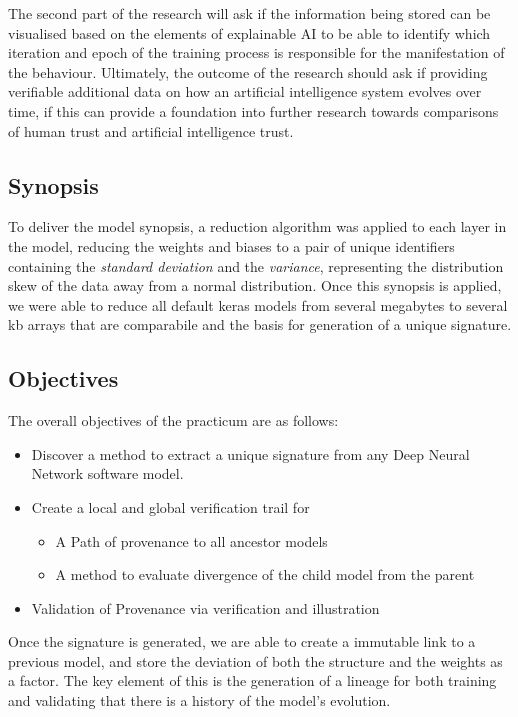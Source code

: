  The second part of the research will ask if the
information being stored can be visualised based on the elements of explainable
AI to be able to identify which iteration and epoch of the training process is
responsible for the manifestation of the behaviour. Ultimately, the outcome of
the research should ask if providing verifiable additional data on how an
artificial intelligence system evolves over time, if this can provide a
foundation into further research towards comparisons of human trust and
artificial intelligence trust.

\subsection{Synopsis}
To deliver the model synopsis, a reduction algorithm was applied to each layer in the model, reducing the weights and biases to a pair of unique identifiers containing the \textit{standard deviation} and the \textit{variance}, representing the distribution skew of the data away from a normal distribution. Once this synopsis is applied, we were able to reduce all default keras models from several megabytes to several kb arrays that are comparabile and the basis for generation of a unique signature.

\subsection{Objectives}
The overall objectives of the practicum are as follows:

\begin{itemize}
    \item Discover a method to extract a unique signature from any Deep Neural Network software model.
    \item Create a local and global verification trail for
    \begin{itemize}
        \item A Path of provenance to all ancestor models
        \item A method to evaluate divergence of the child model from the parent
    \end{itemize}
    \item Validation of Provenance via verification and illustration
\end{itemize}

Once the signature is generated, we are able to create a immutable link to a previous model, and store the deviation of both the structure and the weights as a factor. The key element of this is the generation of a lineage for both training and validating that there is a history of the model's evolution.

